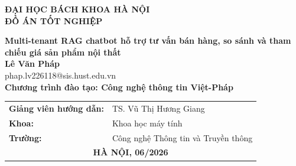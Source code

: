 \documentclass[DoAn.tex]{subfiles}
\begin{document}
\begin{titlepage}
\thispagestyle{empty}
\begin{center}

{\textbf{\large{ĐẠI HỌC BÁCH KHOA HÀ NỘI}}}\\[4cm]

{\textbf{\huge{ ĐỒ ÁN TỐT NGHIỆP}}}\\[1cm]
{\textbf{\Large{Multi-tenant RAG chatbot hỗ trợ tư vấn bán hàng, so sánh và tham chiếu giá sản phẩm nội thất}}\\[1cm]

{\textbf{\large{Lê Văn Pháp}}}\\
{\large{phap.lv226118@sis.hust.edu.vn}}\\[0.5cm]

{\textbf{\large{Chương trình đào tạo: Công nghệ thông tin Việt-Pháp
}}}\\

\vspace{4cm}
\begin{table}[H]
\centering

\begin{tabular}{ll}

\multicolumn{1}{c}{\textbf{Giảng viên hướng dẫn:}}
& TS. Vũ Thị Hương Giang \hspace{0.5cm} \\[0.4cm]


\multicolumn{1}{l}{\textbf{Khoa:}}
& Khoa học máy tính \hspace{0.5cm} \\[0.4cm]

\multicolumn{1}{l}{\textbf{Trường:}}
& Công nghệ Thông tin và Truyền thông \hspace{0.5cm} \\[4cm]

\multicolumn{2}{c}{\textbf{HÀ NỘI, 06/2026}}

\end{tabular}

\end{table}
}
\end{center}



\end{titlepage}
\end{document}
